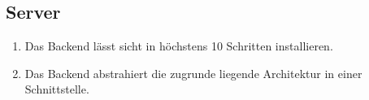 \subsection{Server}

\begin{enumerate}
    \item Das Backend lässt sicht in höchstens 10 Schritten installieren.
    \item Das Backend abstrahiert die zugrunde liegende Architektur in einer Schnittstelle.
\end{enumerate}